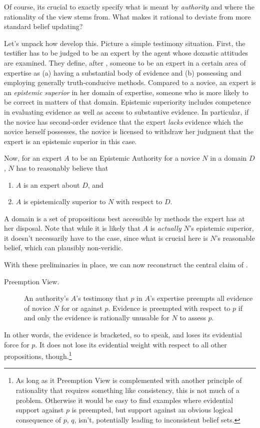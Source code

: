 \documentclass[11pt, a4paper]{scrartcl}
\renewcommand{\i}[1]{\emph{#1}}
\renewcommand{\b}[1]{{\osfamily{}#1}}
\begin{document}
Of course, its crucial to exactly specify what is meant by \i{authority} and where the rationality of the view stems from. What makes it rational to deviate from more standard belief updating?

Let's unpack how \textcite{Constantin2017} develop this. Picture a simple testimony situation. First, the testifier has to be judged to be an expert by the agent whose doxastic attitudes are examined. They define, after \textcite{Goldman2001}, someone to be an expert in a certain area of expertise as (a) having a substantial body of evidence and (b) possessing and employing generally truth-conducive methods. Compared to a novice, an expert is an \i{epistemic superior} in her domain of expertise, someone who is more likely to be correct in matters of that domain. Epistemic superiority includes competence in evaluating evidence as well as access to substantive evidence. In particular, if the novice has second-order evidence that the expert \i{lacks} evidence which the novice herself possesses, the novice is licensed to withdraw her judgment that the expert is an epistemic superior in this case. 

Now, for an expert $A$ to be an \b{Epistemic Authority} for a novice $N$ in a domain $D$, $N$ has to reasonably believe that 
\begin{enumerate}[label = (\roman*)]
    \item $A$ is an expert about $D$, and
    \item $A$ is epistemically superior to $N$ with respect to $D$.
\end{enumerate}
A domain is a set of propositions best accessible by methods the expert has at her disposal. Note that while it is likely that $A$ is \i{actually} $N$'s epistemic superior, it doesn't necessarily have to the case, since what is crucial here is $N$'s reasonable belief, which can plausibly non-veridic. 

With these preliminaries in place, we can now reconstruct the central claim of \textcite{Constantin2017}. 
\begin{description}
    \item[Preemption View.] An authority's $A$'s testimony that $p$ in $A$'s expertise preempts all evidence of novice $N$ for or against $p$. Evidence is preempted with respect to $p$ if and only the evidence is rationally unusable for $N$ to assess $p$. 
\end{description}

In other words, the evidence is bracketed, so to speak, and loses its evidential force for $p$. It does not lose its evidential weight with respect to all other propositions, though.\footnote{As long as it Preemption View is complemented with another principle of rationality that requires something like consistency, this is not much of a problem. Otherwise it would be easy to find examples where evidential support against $p$ is preempted, but support against an obvious logical consequence of $p$, $q$, isn't, potentially leading to inconsistent belief sets.} 
\end{document}
